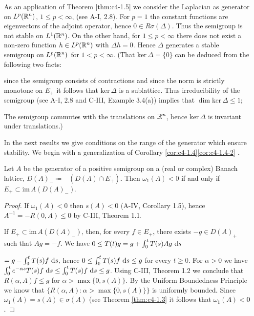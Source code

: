 As an application of Theorem \ref{thm:c4-1.5}  we consider the Laplacian as generator on $L^{p}(\mathbb{R}^{n})$, $1 \leq p < \infty$, (see A-I, 2.8).
For $p = 1$ the constant functions are eigenvectors of the adjoint operator, hence $0 \in R{\sigma}(\Delta)$.
Thus the semigroup is not stable on $L^{1}(\mathbb{R}^{n})$.
On the other hand, for $1 \leq p < \infty$ there does not exist a non-zero function $h \in L^{p}(\mathbb{R}^{n})$ with $\Delta h = 0$.
Hence $\Delta$ generates a stable semigroup on $L^{p}(\mathbb{R}^{n})$ for $1 < p < \infty$.
(That $\text{ker} \, \Delta = \{0\}$ can be deduced from the following two facts:
\begin{enumerate*}[-]
\item \label{enum:c4-1.5-kgk1}
since the semigroup consists of contractions and since the norm is strictly monotone on $E_{+}$ it follows that $\text{ker} \, \Delta$ is a sublattice.
Thus irreducibility of the semigroup (see A-I, 2.8 and C-III, Example 3.4(a)) implies that $\dim \text{ker} \, \Delta \leq 1$;
\item \label{enum:c4-1.5-kgk2}
The semigroup commutes with the translations on $\mathbb{R}^{n}$, hence $\text{ker} \, \Delta$ is invariant under translations.)
\end{enumerate*}

In the next results we give conditions on the range of the generator which ensure stability.
We begin with a generalization of Corollary \ref{cor:c4-1.4}\ref{cor:c4-1.4-2} .
\begin{proposition}\label{prop:c4-1.6}
Let $A$ be the generator of a positive semigroup on a (real or complex) Banach lattice, $D(A)_{-} \coloneqq -(D(A) \cap E_{+})$.
Then $\omega_{1}(A) < 0$ if and only if $E_{+} \subset \text{im} \, A(D(A)_{-})$.
\end{proposition}

\begin{proof}
If $\omega_{1}(A) < 0$ then $s(A) < 0$ (A-IV, Corollary 1.5), hence $A^{-1} = -R(0,A) \leq 0$ by C-III, Theorem 1.1.

If $E_{+} \subset \text{im} \, A(D(A)_{-})$, then, for every $f \in E_{+}$, there exists $-g \in D(A)_{+}$ such that $Ag = -f$.
We have $0 \leq T(t)g = g + \int_{0}^{t} T(s)Ag \, \mathop{}\!\mathrm{d}{s}$


$= g - \int_{0}^{t} T(s)f \, \mathop{}\!\mathrm{d}{s}$, hence $0 \leq \int_{0}^{t} T(s)f \, \mathop{}\!\mathrm{d}{s} \leq g$ for every $t \geq 0$.
For $\alpha > 0$ we have $\int_{0}^{t} e^{-\alpha s}T(s)f \, \mathop{}\!\mathrm{d}{s} \leq \int_{0}^{t} T(s)f \, \mathop{}\!\mathrm{d}{s} \leq g$.
Using C-III, Theorem 1.2 we conclude that $R(\alpha,A)f \leq g$ for $\alpha > \max\{0,s(A)\}$.
By the Uniform Boundedness Principle we know that $\{R(\alpha,A) \colon \alpha > \max\{0,s(A)\}\}$ is uniformly bounded.
Since $\omega_{1}(A) = s(A) \in \sigma(A)$ (see Theorem \ref{thm:c4-1.3} it follows that $\omega_{1}(A) < 0$.
\end{proof}


